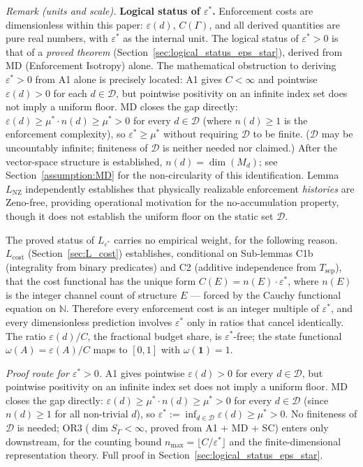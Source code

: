 \documentclass[11pt]{article}
\theoremstyle{remark}
\begin{document}
\smallskip\noindent\textit{Remark (units and scale).}
\smallskip\noindent\textbf{Logical status of $\varepsilon^*$.}
Enforcement costs are dimensionless within this paper: $\varepsilon(d)$, $C(\Gamma)$, and all derived quantities are pure real numbers, with $\varepsilon^*$ as the internal unit.  The logical status of $\varepsilon^* > 0$ is that of a \emph{proved theorem} (Section~\ref{sec:logical_status_eps_star}), derived from MD (Enforcement Isotropy) alone.  The mathematical obstruction to deriving $\varepsilon^* > 0$ from A1 alone is precisely located: A1 gives $C < \infty$ and pointwise $\varepsilon(d) > 0$ for each $d \in \mathcal{D}$, but pointwise positivity on an infinite index set does not imply a uniform floor.  MD closes the gap directly: $\varepsilon(d) \geq \mu^* \cdot n(d) \geq \mu^* > 0$ for every $d \in \mathcal{D}$ (where $n(d) \ge 1$ is the enforcement complexity), so $\varepsilon^* \geq \mu^*$ without requiring $\mathcal{D}$ to be finite.  ($\mathcal{D}$ may be uncountably infinite; finiteness of $\mathcal{D}$ is neither needed nor claimed.)  After the vector-space structure is established, $n(d) = \dim(M_d)$; see Section~\ref{assumption:MD} for the non-circularity of this identification.  Lemma $L_{\mathrm{NZ}}$ independently establishes that physically realizable enforcement \emph{histories} are Zeno-free, providing operational motivation for the no-accumulation property, though it does not establish the uniform floor on the static set $\mathcal{D}$.

The proved status of $L_{\varepsilon^*}$ carries no empirical weight, for the following reason.  $L_{\mathrm{cost}}$ (Section~\ref{sec:L_cost}) establishes, conditional on Sub-lemmas C1b (integrality from binary predicates) and C2 (additive independence from $T_{\mathrm{sep}}$), that the cost functional has the unique form $C(E) = n(E) \cdot \varepsilon^*$, where $n(E)$ is the integer channel count of structure $E$ — forced by the Cauchy functional equation on $\mathbb{N}$.  Therefore every enforcement cost is an integer multiple of $\varepsilon^*$, and every dimensionless prediction involves $\varepsilon^*$ only in ratios that cancel identically.  The ratio $\varepsilon(d)/C$, the fractional budget share, is $\varepsilon^*$-free; the state functional $\omega(A) = \varepsilon(A)/C$ maps to $[0,1]$ with $\omega(\mathbf{1}) = 1$.

\smallskip\noindent\textit{Proof route for $\varepsilon^* > 0$.}  A1 gives pointwise $\varepsilon(d) > 0$ for every $d \in \mathcal{D}$, but pointwise positivity on an infinite index set does not imply a uniform floor.  MD closes the gap directly: $\varepsilon(d) \geq \mu^* \cdot n(d) \geq \mu^* > 0$ for every $d \in \mathcal{D}$ (since $n(d) \ge 1$ for all non-trivial $d$), so $\varepsilon^* := \inf_{d \in \mathcal{D}} \varepsilon(d) \geq \mu^* > 0$.  No finiteness of $\mathcal{D}$ is needed; OR3 ($\dim S_\Gamma < \infty$, proved from A1 + MD + SC) enters only downstream, for the counting bound $n_{\max} = \lfloor C/\varepsilon^* \rfloor$ and the finite-dimensional representation theory.  Full proof in Section~\ref{sec:logical_status_eps_star}.
\end{document}

